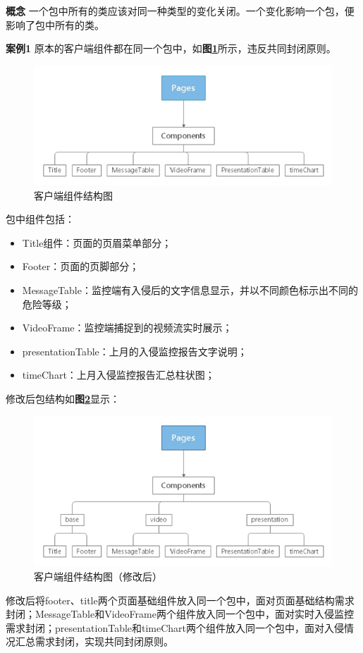 \documentclass[article]{BJTU-thesis}
\begin{document}
\textbf{概念} 一个包中所有的类应该对同一种类型的变化关闭。一个变化影响一个包，便影响了包中所有的类。

\textbf{案例1} 原本的客户端组件都在同一个包中，如\textbf{图\ref{fig:fig16}}所示，违反共同封闭原则。

\begin{figure}[!htbp]
	\centering
	\includegraphics[scale=0.8]{img/8.png}
	\caption{客户端组件结构图}\label{fig:fig16}
\end{figure}

包中组件包括：
\begin{itemize}
	\item Title组件：页面的页眉菜单部分；
	\item Footer：页面的页脚部分；
	\item MessageTable：监控端有入侵后的文字信息显示，并以不同颜色标示出不同的危险等级；
	\item VideoFrame：监控端捕捉到的视频流实时展示；
	\item presentationTable：上月的入侵监控报告文字说明；
	\item timeChart：上月入侵监控报告汇总柱状图；
\end{itemize}

修改后包结构如\textbf{图\ref{fig:fig17}}显示：

\begin{figure}[!htbp]
	\centering
	\includegraphics[scale=0.8]{img/9.png}
	\caption{客户端组件结构图（修改后）}\label{fig:fig17}
\end{figure}
\newpage
修改后将footer、title两个页面基础组件放入同一个包中，面对页面基础结构需求封闭；MessageTable和VideoFrame两个组件放入同一个包中，面对实时入侵监控需求封闭；presentationTable和timeChart两个组件放入同一个包中，面对入侵情况汇总需求封闭，实现共同封闭原则。
\end{document}
